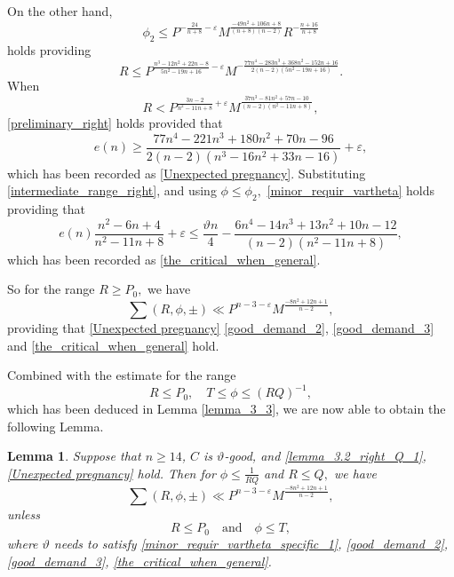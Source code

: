\documentclass[12pt]{amsart}
\newtheorem{lemma}[theorem]{Lemma}
\theoremstyle{definition}
\numberwithin{equation}{section}
\begin{document}
On the other hand, 
\begin{equation*}
    \phi_2 \leq P^{-\frac{24}{n+8}-\varepsilon}M^{\frac{-49n^2+106n+8}{(n+8)(n-2)}}R^{-\frac{n+16}{n+8}}
\end{equation*}
holds providing
\begin{equation}
    \label{preliminary_right}
    R \leq P^{\frac{n^3-12n^2+22n-8}{5n^2-19n+16}-\varepsilon} M^{-\frac{77n^4-283n^3+368n^2-152n+16}{2(n-2)(5n^2-19n+16)}}.
\end{equation}
When
\begin{equation}
\label{intermediate_range_right}
    R < P^{\frac{3n-2}{n^2-11n+8}+\varepsilon}M^{\frac{37n^3-81n^2+57n-10}{(n-2)(n^2-11n+8)}},
\end{equation}
\eqref{preliminary_right}
holds provided that
\begin{equation*}
    e(n) \geq \frac{77n^4-221n^3+180n^2+70n-96}{2(n-2)(n^3-16n^2+33n-16)}+\varepsilon,
\end{equation*}
which has been recorded as \eqref{Unexpected pregnancy}.
Substituting \eqref{intermediate_range_right}, and using $\phi \leq \phi_2,$
\eqref{minor_requir_vartheta} 
holds providing that
\begin{equation*}
    e(n)\frac{n^2-6n+4}{n^2-11n+8}+\varepsilon
    \leq \frac{\vartheta n}{4}-\frac{6n^4-14n^3+13n^2+10n-12}{(n-2)(n^2-11n+8)},
\end{equation*}
which has been recorded as \eqref{the_critical_when_general}.


So for the range $R \geq P_0,$ we have
\begin{equation*}
    \sum(R,\phi,\pm) \ll P^{n-3-\varepsilon}M^{\frac{-8n^2+12n+1}{n-2}},
\end{equation*}
providing that 
\eqref{Unexpected pregnancy}
\eqref{good_demand_2}, \eqref{good_demand_3} and \eqref{the_critical_when_general}
hold.

Combined with the estimate for the range
$$
R \leq P_0, \quad T \leq \phi \leq (RQ)^{-1},
$$
which has been deduced in Lemma \ref{lemma_3_3}, we are now able to obtain the following Lemma.

\begin{lemma}
    \label{lemma_3_7}
    Suppose that $n\geq 14$, $C$ is $\vartheta$-good, and \eqref{lemma_3.2_right_Q_1}, \eqref{Unexpected pregnancy} hold.
    Then for $\phi \leq \frac{1}{RQ}$ and $R \leq Q,$ we have
    \begin{equation*}
        \sum(R,\phi,\pm) \ll P^{n-3-\varepsilon}M^{\frac{-8n^2+12n+1}{n-2}},
    \end{equation*}
    unless
    \begin{equation}
        R\leq P_0 \quad\text{and}\quad\phi \leq T,
    \end{equation}
    where $\vartheta$ needs to satisfy \eqref{minor_requir_vartheta_specific_1}, \eqref{good_demand_2}, \eqref{good_demand_3}, \eqref{the_critical_when_general}. 
\end{lemma}
\end{document}
